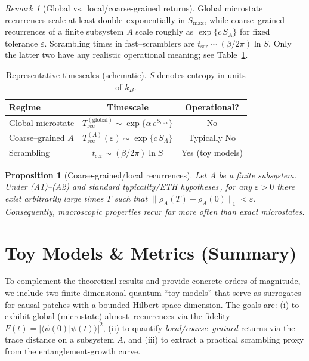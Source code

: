 \documentclass[12pt]{article}
\newtheorem{proposition}{Proposition}
\theoremstyle{remark}
\newtheorem{remark}{Remark}
\begin{document}
\begin{remark}[Global vs.\ local/coarse-grained returns]\label{rem:times}
Global microstate recurrences scale at least double–exponentially in $S_{\max}$, 
while coarse–grained recurrences of a finite subsystem $A$ scale roughly as 
$\exp\{c\,S_A\}$ for fixed tolerance $\varepsilon$. 
Scrambling times in fast–scramblers are $t_{\mathrm{scr}}\sim (\beta/2\pi)\ln S$.
Only the latter two have any realistic operational meaning; see Table~\ref{tab:times}.
\end{remark}

\begin{table}[t]
\centering
\caption{Representative timescales (schematic). $S$ denotes entropy in units of $k_B$.}
\begin{tabular}{lcc}
\toprule
Regime & Timescale & Operational? \\
\midrule
Global microstate & $\displaystyle T^{\mathrm{(global)}}_{\mathrm{rec}}\sim \exp\{\alpha\,e^{S_{\max}}\}$ & No \\
Coarse–grained $A$ & $\displaystyle T^{(A)}_{\mathrm{rec}}(\varepsilon)\sim \exp\{c\,S_A\}$ & Typically No \\
Scrambling & $\displaystyle t_{\mathrm{scr}}\sim (\beta/2\pi)\ln S$ & Yes (toy models) \\
\bottomrule
\end{tabular}
\label{tab:times}
\end{table}


\begin{proposition}[Coarse-grained/local recurrences]\label{prop:coarse}
Let $A$ be a finite subsystem. Under (A1)--(A2) and standard typicality/ETH hypotheses\,\cite{GoldsteinEtAl2006,Deutsch1991}, for any $\varepsilon>0$ there exist arbitrarily large times $T$ such that $\lVert\rho_A(T)-\rho_A(0)\rVert_1<\varepsilon$. Consequently, macroscopic properties recur far more often than exact microstates.
\end{proposition}


\section{Toy Models \& Metrics (Summary)}
\label{sec:toymodels}

To complement the theoretical results and provide concrete orders of magnitude, we include two finite-dimensional quantum “toy models” that serve as surrogates for causal patches with a bounded Hilbert-space dimension. The goals are: (i) to exhibit global (microstate) almost–recurrences via the fidelity
\(
F(t)=|\langle\psi(0)|\psi(t)\rangle|^2
\),
(ii) to quantify \emph{local/coarse–grained} returns via the trace distance on a subsystem \(A\),
and (iii) to extract a practical scrambling proxy from the entanglement-growth curve.
\end{document}
